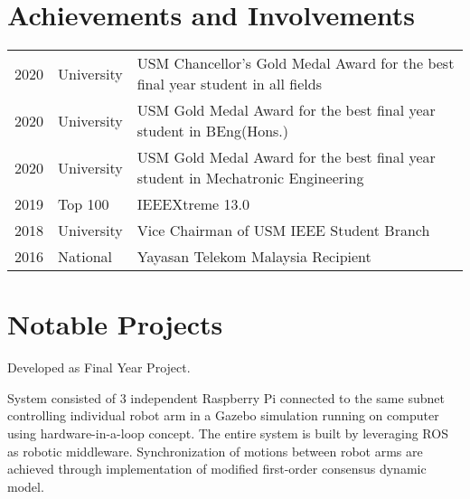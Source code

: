 \documentclass[letterpaper]{deedy-resume} %
\begin{document}
\begin{minipage}[t]{0.66\textwidth} %

\section{Achievements and Involvements} 

\begin{tabular}{rlp{}}
2020	 & University & USM Chancellor's Gold Medal Award for the best final year student in all fields\\
2020	 & University & USM Gold Medal Award for the best final year student in BEng(Hons.)\\
2020	 & University & USM Gold Medal Award for the best final year student in Mechatronic Engineering\\
2019	 & Top 100 & IEEEXtreme 13.0\\
2018 	 & University & Vice Chairman of USM IEEE Student Branch\\
2016	 & National & Yayasan Telekom Malaysia Recipient\\
\end{tabular}

\sectionspace

\section{Notable Projects}

\vspace{\topsep}
\begin{tightitemize}
\item Developed as Final Year Project.
\item System consisted of 3 independent Raspberry Pi connected to the same subnet controlling individual robot arm in a Gazebo simulation running on computer using hardware-in-a-loop concept. 
The entire system is built by leveraging ROS as robotic middleware. 
Synchronization of motions between robot arms are achieved through implementation of modified first-order consensus dynamic model.
\end{tightitemize} 
\sectionspace %


\end{minipage}
\end{document}
